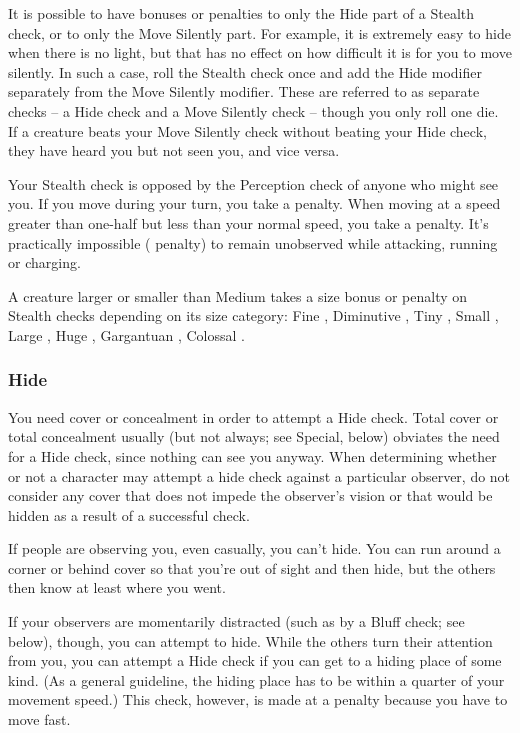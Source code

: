 It is possible to have bonuses or penalties to only the Hide part of a Stealth check, or to only the Move Silently part. For example, it is extremely easy to hide when there is no light, but that has no effect on how difficult it is for you to move silently. In such a case, roll the Stealth check once and add the Hide modifier separately from the Move Silently modifier. These are referred to as separate checks -- a Hide check and a Move Silently check -- though you only roll one die. If a creature beats your Move Silently check without beating your Hide check, they have heard you but not seen you, and vice versa.

 Your Stealth check is opposed by the Perception check of anyone who might see you. If you move during your turn, you take a  penalty. When moving at a speed greater than one-half but less than your normal speed, you take a  penalty. It's practically impossible ( penalty) to remain unobserved while attacking, running or charging.

A creature larger or smaller than Medium takes a size bonus or penalty on Stealth checks depending on its size category: Fine , Diminutive , Tiny , Small , Large , Huge , Gargantuan , Colossal .

\subsubsection{Hide}
You need cover or concealment in order to attempt a Hide check. Total cover or total concealment usually (but not always; see Special, below) obviates the need for a Hide check, since nothing can see you anyway. When determining whether or not a character may attempt a hide check against a particular observer, do not consider any cover that does not impede the observer's vision or that would be hidden as a result of a successful check.

If people are observing you, even casually, you can't hide. You can run around a corner or behind cover so that you're out of sight and then hide, but the others then know at least where you went.

If your observers are momentarily distracted (such as by a Bluff check; see below), though, you can attempt to hide. While the others turn their attention from you, you can attempt a Hide check if you can get to a hiding place of some kind. (As a general guideline, the hiding place has to be within a quarter of your movement speed.) This check, however, is made at a  penalty because you have to move fast.

